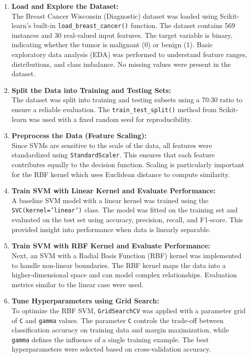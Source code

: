 \documentclass[a4paper,12pt]{article}
\begin{document}
\begin{enumerate}
    \item \textbf{Load and Explore the Dataset:} \\
    The Breast Cancer Wisconsin (Diagnostic) dataset was loaded using Scikit-learn's built-in \texttt{load\_breast\_cancer()} function. The dataset contains 569 instances and 30 real-valued input features. The target variable is binary, indicating whether the tumor is malignant (0) or benign (1). Basic exploratory data analysis (EDA) was performed to understand feature ranges, distributions, and class imbalance. No missing values were present in the dataset.

    \item \textbf{Split the Data into Training and Testing Sets:} \\
    The dataset was split into training and testing subsets using a 70:30 ratio to ensure a reliable evaluation. The \texttt{train\_test\_split()} method from Scikit-learn was used with a fixed random seed for reproducibility.

    \item \textbf{Preprocess the Data (Feature Scaling):} \\
    Since SVMs are sensitive to the scale of the data, all features were standardized using \texttt{StandardScaler}. This ensures that each feature contributes equally to the decision function. Scaling is particularly important for the RBF kernel which uses Euclidean distance to compute similarity.

    \item \textbf{Train SVM with Linear Kernel and Evaluate Performance:} \\
    A baseline SVM model with a linear kernel was trained using the \texttt{SVC(kernel='linear')} class. The model was fitted on the training set and evaluated on the test set using accuracy, precision, recall, and F1-score. This provided insight into performance when data is linearly separable.

    \item \textbf{Train SVM with RBF Kernel and Evaluate Performance:} \\
    Next, an SVM with a Radial Basis Function (RBF) kernel was implemented to handle non-linear boundaries. The RBF kernel maps the data into a higher-dimensional space and can model complex relationships. Evaluation metrics similar to the linear case were used.

    \item \textbf{Tune Hyperparameters using Grid Search:} \\
    To optimize the RBF SVM, \texttt{GridSearchCV} was applied with a parameter grid of \texttt{C} and \texttt{gamma} values. The parameter \texttt{C} controls the trade-off between classification accuracy on training data and margin maximization, while \texttt{gamma} defines the influence of a single training example. The best hyperparameters were selected based on cross-validation accuracy.


\end{enumerate}
\end{document}
